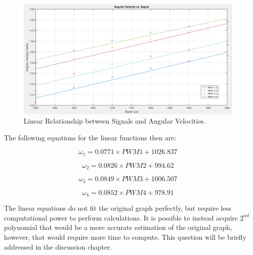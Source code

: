 \begin{figure}[H]
  \centering
    \includegraphics[width=1\textwidth]{images/polyfits.png}
	\caption{Linear Relationship between Signals and Angular Velocities.}
	\label{RadsTrendline}
\end{figure}
The following equations for the linear functions then are:
\begin{center}
\begin{equation}
	\omega _1 = 0.0771\times PWM1 + 1026.837
\end{equation}



\begin{equation}
	\omega _2 = 0.0826\times PWM2 + 994.62
\end{equation}



\begin{equation}
	\omega _3 = 0.0849\times PWM3 + 1006.507
\end{equation}



\begin{equation}
	\omega _4 = 0.0852\times PWM4 + 978.91
\end{equation}
\end{center}
The linear equations do not fit the original graph perfectly, but require less computational power to perform calculations. It is possible to instead acquire $2^{nd}$ polynomial that would be a more accurate estimation of the original graph, however, that would require more time to compute. This question will be briefly addressed in the discussion chapter. 

